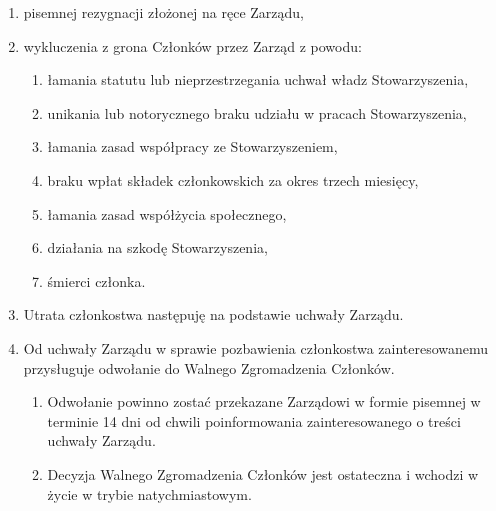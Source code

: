 \documentclass{article}
\begin{document}
\begin{enumerate}
      \begin{enumerate}
        \item pisemnej rezygnacji złożonej na ręce Zarządu,
        \item wykluczenia z grona Członków przez Zarząd z powodu:
          \begin{enumerate}
            \item łamania statutu lub nieprzestrzegania uchwał władz Stowarzyszenia,
            \item unikania lub notorycznego braku udziału w pracach Stowarzyszenia,
            \item łamania zasad współpracy ze Stowarzyszeniem,
            \item braku wpłat składek członkowskich za okres trzech miesięcy,
            \item łamania zasad współżycia społecznego,
            \item działania na szkodę Stowarzyszenia,
            \item śmierci członka.
          \end{enumerate}
        \item Utrata członkostwa następuję na podstawie uchwały Zarządu.
        \item Od uchwały Zarządu w sprawie pozbawienia członkostwa zainteresowanemu przysługuje odwołanie do Walnego Zgromadzenia Członków.
          \begin{enumerate}
            \item Odwołanie powinno zostać przekazane Zarządowi w formie pisemnej w terminie 14 dni od chwili poinformowania zainteresowanego o treści uchwały Zarządu.
            \item Decyzja Walnego Zgromadzenia Członków jest ostateczna i wchodzi w życie w trybie natychmiastowym.
          \end{enumerate}
      \end{enumerate}
  \end{enumerate}
\end{document}
